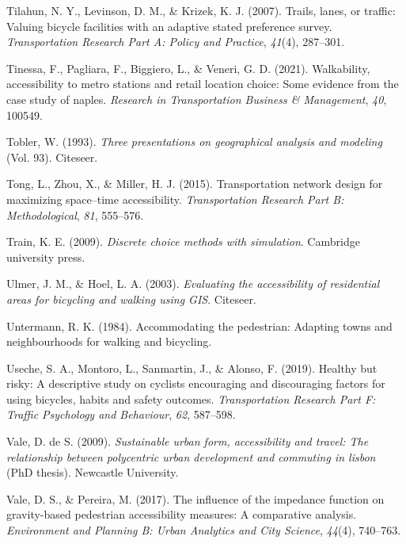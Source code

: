 \documentclass[
11pt, %
oneside, %
english, %
singlespacing, %
]{macthesis} %
\newlength{\cslhangindent}
\newenvironment{CSLReferences}[2] %
{\begin{list}{}{%
	\setlength{\itemindent}{0pt}
	\setlength{\leftmargin}{0pt}
	\setlength{\parsep}{0pt}
	\ifodd #1
	\setlength{\leftmargin}{\cslhangindent}
	\setlength{\itemindent}{-1\cslhangindent}
	\fi
	\setlength{\itemsep}{#2\baselineskip}}}
{\end{list}}
\begin{document}
\begin{CSLReferences}{1}{0}
Tilahun, N. Y., Levinson, D. M., \& Krizek, K. J. (2007). Trails, lanes, or traffic: Valuing bicycle facilities with an adaptive stated preference survey. \emph{Transportation Research Part A: Policy and Practice}, \emph{41}(4), 287--301.

Tinessa, F., Pagliara, F., Biggiero, L., \& Veneri, G. D. (2021). Walkability, accessibility to metro stations and retail location choice: Some evidence from the case study of naples. \emph{Research in Transportation Business \& Management}, \emph{40}, 100549.

Tobler, W. (1993). \emph{Three presentations on geographical analysis and modeling} (Vol. 93). Citeseer.

Tong, L., Zhou, X., \& Miller, H. J. (2015). Transportation network design for maximizing space--time accessibility. \emph{Transportation Research Part B: Methodological}, \emph{81}, 555--576.

Train, K. E. (2009). \emph{Discrete choice methods with simulation}. Cambridge university press.

Ulmer, J. M., \& Hoel, L. A. (2003). \emph{Evaluating the accessibility of residential areas for bicycling and walking using GIS}. Citeseer.

Untermann, R. K. (1984). Accommodating the pedestrian: Adapting towns and neighbourhoods for walking and bicycling.

Useche, S. A., Montoro, L., Sanmartin, J., \& Alonso, F. (2019). Healthy but risky: A descriptive study on cyclists encouraging and discouraging factors for using bicycles, habits and safety outcomes. \emph{Transportation Research Part F: Traffic Psychology and Behaviour}, \emph{62}, 587--598.

Vale, D. de S. (2009). \emph{Sustainable urban form, accessibility and travel: The relationship between polycentric urban development and commuting in lisbon} (PhD thesis). Newcastle University.

Vale, D. S., \& Pereira, M. (2017). The influence of the impedance function on gravity-based pedestrian accessibility measures: A comparative analysis. \emph{Environment and Planning B: Urban Analytics and City Science}, \emph{44}(4), 740--763.


\end{CSLReferences}
\end{document}

